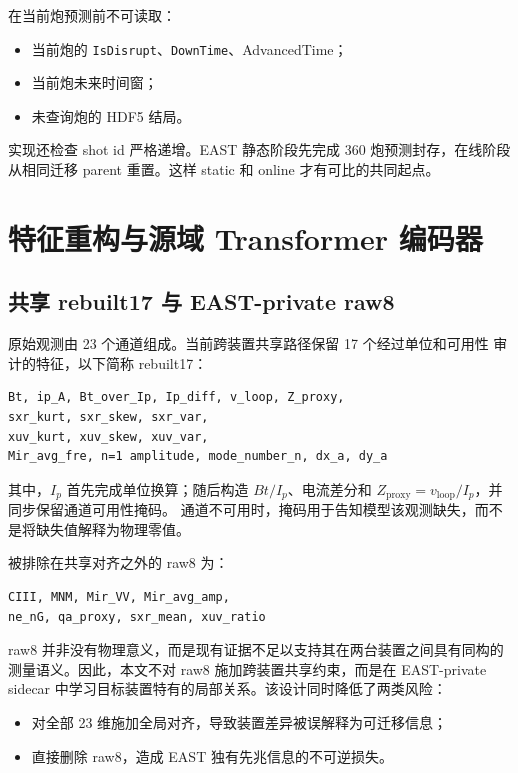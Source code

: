 \documentclass[11pt,a4paper]{article}
\newcommand{\code}[1]{\texttt{\small #1}}
\begin{document}
在当前炮预测前不可读取：

\begin{itemize}
\item 当前炮的 \code{IsDisrupt}、\code{DownTime}、AdvancedTime；
\item 当前炮未来时间窗；
\item 未查询炮的 HDF5 结局。
\end{itemize}

实现还检查 shot id 严格递增。EAST 静态阶段先完成 360 炮预测封存，在线阶段
从相同迁移 parent 重置。这样 static 和 online 才有可比的共同起点。

\section{特征重构与源域 Transformer 编码器}

\subsection{共享 rebuilt17 与 EAST-private raw8}

原始观测由 23 个通道组成。当前跨装置共享路径保留 17 个经过单位和可用性
审计的特征，以下简称 rebuilt17：

\begin{lstlisting}
Bt, ip_A, Bt_over_Ip, Ip_diff, v_loop, Z_proxy,
sxr_kurt, sxr_skew, sxr_var,
xuv_kurt, xuv_skew, xuv_var,
Mir_avg_fre, n=1 amplitude, mode_number_n, dx_a, dy_a
\end{lstlisting}

其中，\(I_p\) 首先完成单位换算；随后构造 \(Bt/I_p\)、电流差分和
\(Z_{\mathrm{proxy}}=v_{\mathrm{loop}}/I_p\)，并同步保留通道可用性掩码。
通道不可用时，掩码用于告知模型该观测缺失，而不是将缺失值解释为物理零值。

被排除在共享对齐之外的 raw8 为：

\begin{lstlisting}
CIII, MNM, Mir_VV, Mir_avg_amp,
ne_nG, qa_proxy, sxr_mean, xuv_ratio
\end{lstlisting}

raw8 并非没有物理意义，而是现有证据不足以支持其在两台装置之间具有同构的
测量语义。因此，本文不对 raw8 施加跨装置共享约束，而是在 EAST-private
sidecar 中学习目标装置特有的局部关系。该设计同时降低了两类风险：

\begin{itemize}
\item 对全部 23 维施加全局对齐，导致装置差异被误解释为可迁移信息；
\item 直接删除 raw8，造成 EAST 独有先兆信息的不可逆损失。
\end{itemize}
\end{document}
